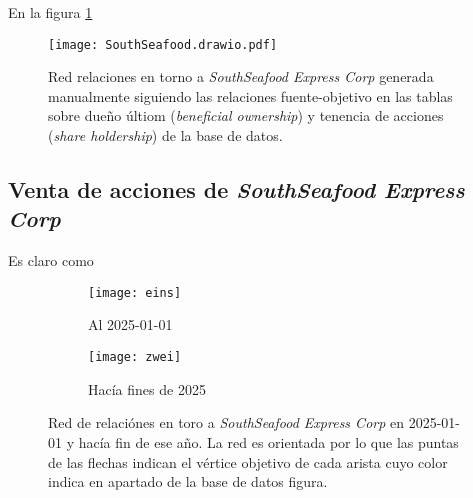 \documentclass[11pt,spanish,a4paper]{article}
\begin{document}
En la figura \ref{fig:drawio} 

\begin{figure}[!ht]
	\centering
	\texttt{[image: SouthSeafood.drawio.pdf]}
	\caption{Red relaciones en torno a \emph{SouthSeafood Express Corp} generada manualmente siguiendo las relaciones fuente-objetivo en las tablas sobre dueño últiom (\emph{beneficial ownership}) y tenencia de acciones (\emph{share holdership}) de la base de datos.}
	\label{fig:drawio}
\end{figure}



\subsection{Venta de acciones de \emph{SouthSeafood Express Corp}}

Es claro como 

\begin{figure}[!ht]
	\centering
	\begin{subfigure}[b]{\textwidth}
		\centering
		\texttt{[image: eins]}
		\caption{Al 2025-01-01}
		\label{fig:antes}
	\end{subfigure}
	\begin{subfigure}[b]{\textwidth}
		\centering
		\texttt{[image: zwei]}
		\caption{Hacía fines de 2025}
		\label{fig:después}
	\end{subfigure}
	\caption{
		Red de relaciónes en toro a \emph{SouthSeafood Express Corp} en 2025-01-01 y hacía fin de ese año.
		La red es orientada por lo que las puntas de las flechas indican el vértice objetivo de cada arista cuyo color indica en apartado de la base de datos figura.
		}
	\label{fig:Networkx}
\end{figure}


\printbibliography[heading=bibintoc] %
\end{document}
